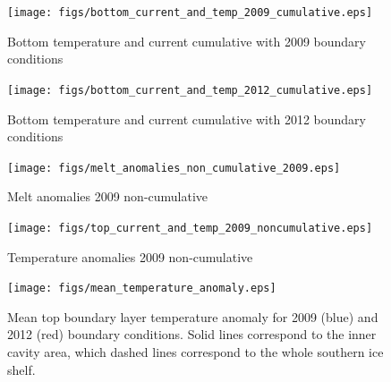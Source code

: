 \documentclass[draft]{agujournal2019}
\begin{document}
\begin{figure}
    \centering
    \texttt{[image: figs/bottom\_current\_and\_temp\_2009\_cumulative.eps]}
    \caption{Bottom temperature and current cumulative with 2009 boundary conditions }
    \label{fig:bottom_temp_anomalies_2009_cumulative}
\end{figure}

\begin{figure}
    \centering
    \texttt{[image: figs/bottom\_current\_and\_temp\_2012\_cumulative.eps]}
    \caption{Bottom temperature and current cumulative with 2012 boundary conditions}
    \label{fig:bottom_temp_anomalies_2012_cumulative}
\end{figure}


\begin{figure}
    \centering
    \texttt{[image: figs/melt\_anomalies\_non\_cumulative\_2009.eps]}
    \caption{Melt anomalies 2009 non-cumulative}
    \label{fig:melt_anomalies_2009_noncumulative}
\end{figure}

\begin{figure}
    \centering
    \texttt{[image: figs/top\_current\_and\_temp\_2009\_noncumulative.eps]}
    \caption{Temperature anomalies 2009 non-cumulative}
    \label{fig:top_temp_anomalies_2009_noncumulative}
\end{figure}

\begin{figure}
    \centering
    \texttt{[image: figs/mean\_temperature\_anomaly.eps]}
    \caption{Mean top boundary layer temperature anomaly for 2009  (blue) and 2012 (red) boundary conditions. Solid lines correspond to the inner cavity area, which dashed lines correspond to the whole southern ice shelf. }
    \label{fig:mean_temperature_anomaly}
\end{figure}

%

\end{document}
